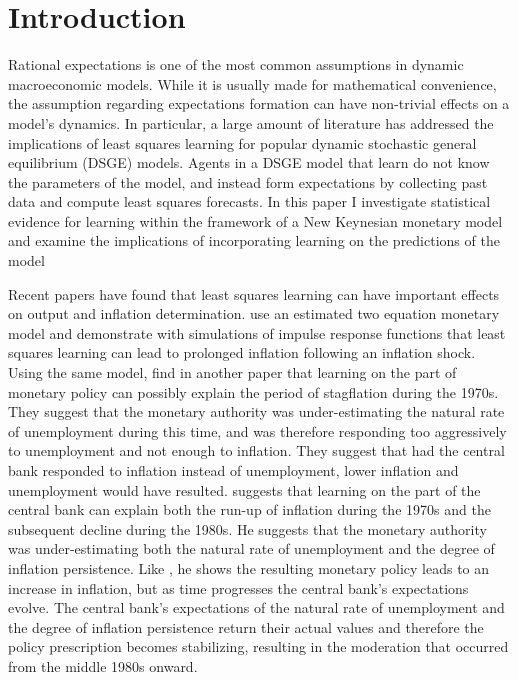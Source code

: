 \section{Introduction}
Rational expectations is one of the most common assumptions in dynamic macroeconomic models.  While it is usually made for mathematical convenience, the assumption regarding expectations formation can have non-trivial effects on a model's dynamics.  In particular, a large amount of literature has addressed the implications of least squares learning for popular dynamic stochastic general equilibrium (DSGE) models.  Agents in a DSGE model that learn do not know the parameters of the model, and instead form expectations by collecting past data and compute least squares forecasts.  In this paper I investigate statistical evidence for learning within the framework of a New Keynesian monetary model and examine the implications of incorporating learning on the predictions of the model

Recent papers have found that least squares learning can have important effects on output and inflation determination.   use an estimated two equation monetary model and demonstrate with simulations of impulse response functions that least squares learning can lead to prolonged inflation following an inflation shock.  Using the same model,  find in another paper that learning on the part of monetary policy can possibly explain the period of stagflation during the 1970s.  They suggest that the monetary authority was under-estimating the natural rate of unemployment during this time, and was therefore responding too aggressively to unemployment and not enough to inflation.  They suggest that had the central bank responded to inflation instead of unemployment, lower inflation and unemployment would have resulted.   suggests that learning on the part of the central bank can explain both the run-up of inflation during the 1970s and the subsequent decline during the 1980s.  He suggests that the monetary authority was under-estimating both the natural rate of unemployment and the degree of inflation persistence.  Like , he shows the resulting monetary policy leads to an increase in inflation, but as time progresses the central bank's expectations evolve.  The central bank's expectations of the natural rate of unemployment and the degree of inflation persistence return their actual values and therefore the policy prescription becomes stabilizing, resulting in the moderation that occurred from the middle 1980s onward.

